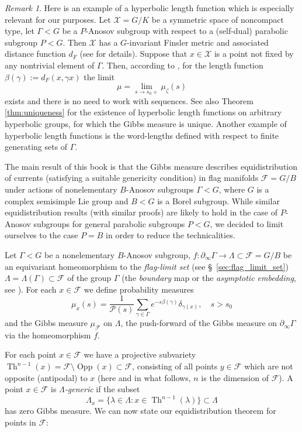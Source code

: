 \documentclass[12pt]{amsbook}%
\theoremstyle{definition}
\theoremstyle{remark}
\newtheorem{introrem}[introthm]{Remark}
\numberwithin{section}{chapter}
\numberwithin{subsection}{section}
\numberwithin{figure}{chapter}
\DeclareMathOperator{\Th}{Th}
\DeclareMathOperator{\Opp}{Opp}
\newcommand\bac[1]{{\color{blue} #1} }
\def\cF{{\mathscr{F}}}
\def\cP{{\mathscr{P}}}
\def\cX{{\mathscr{X}}}
\def\Ga{\Gamma}
\def\La{\Lambda}
\def\la{\lambda}
\def\geo{\partial_\infty}
\begin{document}
\begin{introrem}
Here is an example of a hyperbolic length function which is especially relevant for our purposes. Let $\cX=G/K$ be a symmetric space of noncompact type, let $\Gamma< G$ be a $P$-Anosov  subgroup with respect to a (self-dual) parabolic subgroup $P< G$. 
Then $\cX$ has a $G$-invariant Finsler metric and associated distance function $d_F$ (see \cite{Kapovich-Leeb-finsler, Dey-Kapovich} for details). Suppose that $x\in \cX$ is a point not fixed by any nontrivial element of $\Gamma$. 
Then, according to \cite{Dey-Kapovich}, for the length function $\beta(\gamma):= 
d_F(x, \gamma x)$ the limit 
$$
\mu= \lim_{s\to s_0+} \mu_\zeta(s)
$$ 
exists and there is no need to work with sequences. See also Theorem \ref{thm:uniqueness} for the existence of hyperbolic length functions 
on arbitrary hyperbolic groups, for which the Gibbs measure is unique. Another example of hyperbolic length functions is the word-lengths defined with respect to finite generating sets of $\Ga$. 
 \end{introrem}

The main result of this book is that the Gibbs measure describes equidistribution of currents (satisfying a suitable genericity condition) 
in flag manifolds $\cF=G/B$ under actions of nonelementary $B$-Anosov subgroups $\Ga<G$, where $G$ is a complex semisimple Lie group and $B< G$ is a Borel subgroup. While similar equidistribution results (with similar proofs) are likely to hold in the case of $P$-Anosov subgroups for general parabolic subgroups $P< G$, we decided to limit ourselves to the case $P=B$ in order to reduce the technicalities. 


Let $\Ga< G$ be a nonelementary $B$-Anosov subgroup, $f: \geo \Ga\to \La\subset \cF=G/B$ be an equivariant homeomorphism to the {\em flag-limit set} (see \S~\ref{sec:flag_limit_set}) $\La=\Lambda(\Ga)\subset \cF$ of the group $\Ga$ (the {\em boundary} map or the {\em asymptotic embedding}, see \cite{KLP17}). For each $x\in \cF$ we define 
probability measures 
\begin{equation}
\mu_{x}(s) = \frac{1}{\cP(s)}\sum_{\gamma\in \Gamma}e^{-s\beta(\gamma)}\delta_{\gamma(x)}, \quad s> s_0 
 \end{equation}
 and the Gibbs measure $\mu_{\cF}$ on $\La$, the push-forward of the Gibbs measure on $\geo \Ga$ via the homeomorphism $f$. 
 
 
 For each point $x\in \cF$ we have a projective subvariety $\Th^{n-1}(x)=\cF\setminus \Opp(x)\subset \cF$,  consisting of all points $y\in \cF$ which are not opposite (antipodal) to $x$ (here and in what follows, $n$ is the dimension of $\cF$). A point $x\in \cF$ is {\em $\La$-generic} if the subset 
 $$
 \La_x= \{\la\in \La: x\in \Th^{n-1}(\la)\}\subset \La
 $$
has zero Gibbs measure. %
 We can now state our equidistribution theorem for points in $\cF$: 
 
\end{document}
